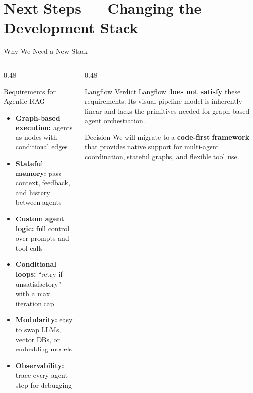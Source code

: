 \documentclass[aspectratio=169]{beamer}
\begin{document}
\section{Next Steps — Changing the Development Stack}

\begin{frame}{Why We Need a New Stack}
  \begin{columns}[T]
    \begin{column}{0.48\textwidth}
      \begin{block}{Requirements for Agentic RAG}
        \small
        \begin{itemize}
          \item \textbf{Graph-based execution:} agents as nodes with conditional edges
          \item \textbf{Stateful memory:} pass context, feedback, and history between agents
          \item \textbf{Custom agent logic:} full control over prompts and tool calls
          \item \textbf{Conditional loops:} ``retry if unsatisfactory'' with a max iteration cap
          \item \textbf{Modularity:} easy to swap LLMs, vector DBs, or embedding models
          \item \textbf{Observability:} trace every agent step for debugging
        \end{itemize}
      \end{block}
    \end{column}
    \begin{column}{0.48\textwidth}
      \begin{alertblock}{Langflow Verdict}
        \small
        Langflow \textbf{does not satisfy} these requirements. Its visual pipeline model is inherently linear and lacks the primitives needed for graph-based agent orchestration.
      \end{alertblock}
      \vspace{0.3cm}
      \begin{block}{Decision}
        \small
        We will migrate to a \textbf{code-first framework} that provides native support for multi-agent coordination, stateful graphs, and flexible tool use.
      \end{block}
    \end{column}
  \end{columns}
\end{frame}
\end{document}
